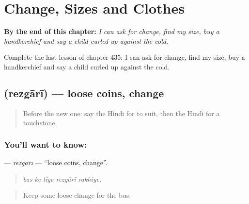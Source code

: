 
\chapter{Change, Sizes and Clothes}
\label{ch:hi-change-sizes-and-clothes}

\begin{chapteropening}
\textbf{By the end of this chapter:} \emph{I can ask for change, find my size, buy a handkerchief and say a child curled up against the cold.}

Complete the last lesson of chapter 435: I can ask for change, find my size, buy a handkerchief and say a child curled up against the cold.
\end{chapteropening}

\section[\texorpdfstring{\hi{रेज़गारी} (rezgārī)}{रेज़गारी (rezgārī)}]{ (rezgārī) — loose coins, change}

\label{lesson:HI-C435-rezgari}



\begin{quote}
Before the new one: say the Hindi for to suit, then the Hindi for a touchstone.
\end{quote}

\subsection*{You'll want to know: }
\textbf{} — \emph{rezgārī} — \textquotedblleft{}loose coins, change\textquotedblright{}.

\begin{quote}
    
\end{quote}

\begin{quote}
\emph{bas ke liye rezgārī rakhiye.}
\end{quote}

\begin{quote}
Keep some loose change for the bus.
\end{quote}

